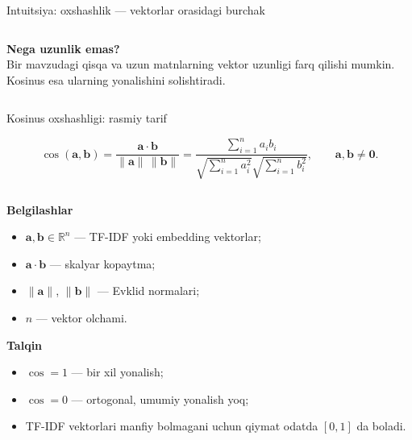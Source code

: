 \documentclass[aspectratio=169,11pt]{beamer}
\begin{document}
\begin{frame}{Intuitsiya: o\textquotesingle{}xshashlik — vektorlar orasidagi burchak}
\begin{columns}[T,totalwidth=\textwidth]
\begin{column}{0.50\textwidth}
\vspace{6pt}

\footnotesize
\textbf{Nega uzunlik emas?}\\
Bir mavzudagi qisqa va uzun matnlarning vektor uzunligi farq qilishi mumkin.
Kosinus esa ularning yo\textquotesingle{}nalishini solishtiradi.
\end{column}
\end{columns}

\end{frame}

\begin{frame}{Kosinus o\textquotesingle{}xshashligi: rasmiy ta\textquotesingle{}rif}
\small

\begin{tcolorbox}[defbox]
\[
\cos(\mathbf{a},\mathbf{b})
=
\frac{\mathbf{a}\cdot\mathbf{b}}
{\|\mathbf{a}\|\,\|\mathbf{b}\|}
=
\frac{\sum_{i=1}^{n} a_i b_i}
{\sqrt{\sum_{i=1}^{n} a_i^2}\sqrt{\sum_{i=1}^{n} b_i^2}},
\qquad
\mathbf{a},\mathbf{b}\neq\mathbf{0}.
\]
\end{tcolorbox}

\vspace{2pt}

\begin{columns}[T,totalwidth=\textwidth]
\begin{column}{0.52\textwidth}
\textbf{Belgilashlar}
\begin{itemize}\setlength\itemsep{4pt}
    \item $\mathbf{a},\mathbf{b}\in\mathbb{R}^{n}$ — TF-IDF yoki embedding vektorlar;
    \item $\mathbf{a}\cdot\mathbf{b}$ — skalyar ko\textquotesingle{}paytma;
    \item $\|\mathbf{a}\|$, $\|\mathbf{b}\|$ — Evklid normalari;
    \item $n$ — vektor o\textquotesingle{}lchami.
\end{itemize}

\vspace{4pt}
\textbf{Talqin}
\begin{itemize}\setlength\itemsep{1pt}
    \item $\cos=1$ — bir xil yo\textquotesingle{}nalish;
    \item $\cos=0$ — ortogonal, umumiy yo\textquotesingle{}nalish yo\textquotesingle{}q;
    \item TF-IDF vektorlari manfiy bo\textquotesingle{}lmagani uchun qiymat odatda $[0,1]$ da bo\textquotesingle{}ladi.
\end{itemize}
\end{column}


\end{columns}
\end{frame}
\end{document}
